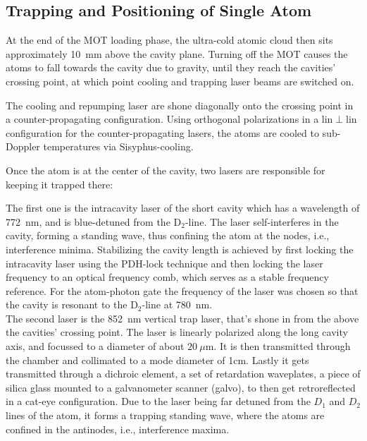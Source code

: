 \subsection{Trapping and Positioning of Single Atom}

At the end of the MOT loading phase, the ultra-cold atomic cloud then sits approximately \SI{10}{mm} above the cavity plane. Turning off the MOT causes the atoms to fall towards the cavity due to gravity, until they reach the cavities' crossing point, at which point cooling and trapping laser beams are switched on.

The cooling and repumping laser are shone diagonally onto the crossing point in a counter-propagating configuration. Using orthogonal polarizations in a lin$\perp$lin configuration for the counter-propagating lasers, the atoms are cooled to sub-Doppler temperatures via Sisyphus-cooling.

Once the atom is at the center of the cavity, two lasers are responsible for keeping it trapped there:

The first one is the intracavity laser of the short cavity which has a wavelength of \SI{772}{nm}, and is blue-detuned from the $\text{D}_2\text{-line}$. The laser self-interferes in the cavity, forming a standing wave, thus confining the atom at the nodes, i.e., interference minima. Stabilizing the cavity length is achieved by first locking the intracavity laser using the PDH-lock technique and then locking the laser frequency to an optical frequency comb, which serves as a stable frequency reference. For the atom-photon gate the frequency of the laser was chosen so that the cavity is resonant to the $\text{D}_2\text{-line}$ at \SI{780}{nm}.\\

The second laser is the \SI{852}{nm} vertical trap laser, that's shone in from the above the cavities' crossing point. The laser is linearly polarized along the long cavity axis, and focussed to a diameter of about $\SI{20}{\mu\metre}$. It is then transmitted through the chamber and collimated to a mode diameter of 1cm. Lastly it gets transmitted through a dichroic element, a set of retardation waveplates, a piece of silica glass mounted to a galvanometer scanner (galvo), to then get retroreflected in a cat-eye configuration. Due to the laser being far detuned from the $D_1$ and $D_2$ lines of the atom, it forms a trapping standing wave, where the atoms are confined in the antinodes, i.e., interference maxima.\\

